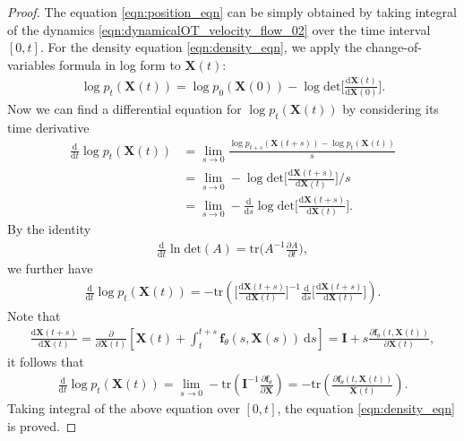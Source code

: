 \documentclass[11pt]{book}
\begin{document}
\begin{proof}
    The equation \eqref{eqn:position_eqn} can be simply obtained by taking integral of the dynamics \eqref{eqn:dynamicalOT_velocity_flow_02} over the time interval $[0,t]$. For the density equation \eqref{eqn:density_eqn}, we apply the change-of-variables formula in log form to $\mathbf{X}(t)$:
    \begin{align*}
        \log p_t(\mathbf{X}(t)) = \log p_0(\mathbf{X}(0)) - \log \mathrm{det} \bigg[\frac{\mathrm{d}\mathbf{X}(t)}{\mathrm{d}\mathbf{X}(0)}\bigg].
    \end{align*}
    Now we can find a differential equation for $\log p_t(\mathbf{X}(t))$ by considering its time derivative
    \begin{align*}
        \frac{\mathrm{d}}{\mathrm{d}t}\log p_t(\mathbf{X}(t)) &= \lim_{s\rightarrow0} \frac{ \log p_{t+s}(\mathbf{X}(t+s)) - \log p_t(\mathbf{X}(t)) }{s} \\
        & = \lim_{s\rightarrow0} - \log \mathrm{det} \bigg[\frac{\mathrm{d}\mathbf{X}(t+s)}{\mathrm{d}\mathbf{X}(t)}\bigg] \big/ s \\
        & = \lim_{s\rightarrow0} - \frac{\mathrm{d}}{\mathrm{d}s} \log \mathrm{det} \bigg[\frac{\mathrm{d}\mathbf{X}(t+s)}{\mathrm{d}\mathbf{X}(t)}\bigg]. 
    \end{align*}
    By the identity
    \begin{align*}
        \frac{\mathrm{d}}{\mathrm{d}t}\ln \mathrm{det}(A) = \mathrm{tr}\Big( A^{-1} \frac{\partial A}{\partial t} \Big),
    \end{align*}
    we further have 
    \begin{align*}
        \frac{\mathrm{d}}{\mathrm{d}t}\log p_t(\mathbf{X}(t)) = - \mathrm{tr}\left(  \bigg[\frac{\mathrm{d}\mathbf{X}(t+s)}{\mathrm{d}\mathbf{X}(t)}\bigg]^{-1} \frac{\mathrm{d}}{\mathrm{d}s}\bigg[\frac{\mathrm{d}\mathbf{X}(t+s)}{\mathrm{d}\mathbf{X}(t)}\bigg]  \right).
    \end{align*}
    Note that
    \begin{align*}
        \frac{\mathrm{d}\mathbf{X}(t+s)}{\mathrm{d}\mathbf{X}(t)} = \frac{\partial}{\partial \mathbf{X}(t)} \left[ \mathbf{X}(t) + \int_t^{t+s} \mathbf{f}_{\theta}(s,\mathbf{X}(s)) \ \mathrm{d}s \right] = \mathbf{I} + s \frac{\partial \mathbf{f}_{\theta}(t,\mathbf{X}(t))}{\partial \mathbf{X}(t)},
    \end{align*}
    it follows that
    \begin{align*}
        \frac{\mathrm{d}}{\mathrm{d}t}\log p_t(\mathbf{X}(t)) = \lim_{s\rightarrow0} - \mathrm{tr}\left(\mathbf{I}^{-1}\frac{\partial\mathbf{f}_{\theta}}{\partial\mathbf{X}}\right) = - \mathrm{tr}\left( \frac{\partial \mathbf{f}_{\theta}(t,\mathbf{X}(t))}{\mathbf{X}(t)}  \right).
    \end{align*}
    Taking integral of the above equation over $[0,t]$, the equation \eqref{eqn:density_eqn} is proved.
\end{proof}
\end{document}
